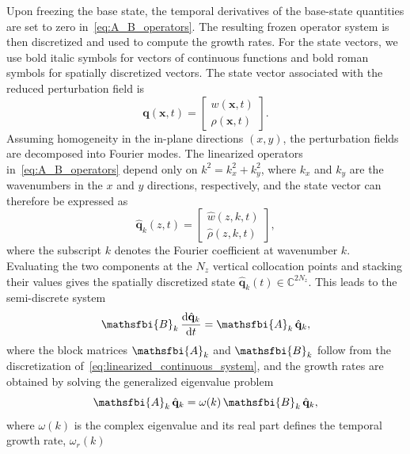 \documentclass[11pt]{article}
\newcommand{\difft}[2]{\frac{\mathrm{d} #1}{\mathrm{d} #2}}
\begin{document}
Upon freezing the base state, the temporal derivatives of the base-state quantities are set to zero in~\eqref{eq:A_B_operators}. The resulting frozen operator system is then discretized and used to compute the growth rates. For the state vectors, we use bold italic symbols for vectors of continuous functions and bold roman symbols for spatially discretized vectors. The state vector associated with the reduced perturbation field is
\begin{equation}
    \boldsymbol{q}(\mathbf{x},t) =
    \begin{bmatrix}
        w(\mathbf{x},t) \\
        \rho(\mathbf{x},t)
    \end{bmatrix}.
\end{equation}
Assuming homogeneity in the in-plane directions \((x,y)\), the perturbation fields are decomposed into Fourier modes. The linearized operators in~\eqref{eq:A_B_operators} depend only on \(k^{2} = k_{x}^{2} + k_{y}^{2}\), where \(k_x\) and \(k_y\) are the wavenumbers in the \(x\) and \(y\) directions, respectively, and the state vector can therefore be expressed as
\begin{equation}
    \hat{\boldsymbol{q}}_{k}(z,t) =
    \begin{bmatrix}
        \hat{w}(z,k,t) \\
        \hat{\rho}(z,k,t)
    \end{bmatrix},
\end{equation}
where the subscript \(k\) denotes the Fourier coefficient at wavenumber \(k\). Evaluating the two components at the \(N_z\) vertical collocation points and stacking their values gives the spatially discretized state \(\hat{\mathbf{q}}_k(t)\in\mathbb{C}^{2N_z}\). This leads to the semi-discrete system
\begin{equation}
    \mathsfbi{B}_{k}\,\difft{\hat{\mathbf{q}}_{k}}{t} = \mathsfbi{A}_{k}\,\hat{\mathbf{q}}_{k},
\end{equation}
where the block matrices \(\mathsfbi{A}_{k}\) and \(\mathsfbi{B}_{k}\) follow from the discretization of~\eqref{eq:linearized_continuous_system}, and the growth rates are obtained by solving the generalized eigenvalue problem
\begin{equation}
    \mathsfbi{A}_{k}\,\hat{\mathbf{q}}_{k} = \omega(k)\,\mathsfbi{B}_{k}\,\hat{\mathbf{q}}_{k},
\end{equation}
where \(\omega(k)\) is the complex eigenvalue and its real part defines the temporal growth rate, \(\omega_r(k)\)
\end{document}
